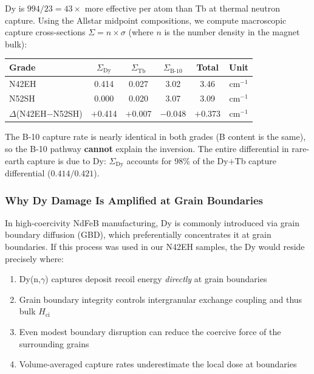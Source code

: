 \documentclass[11pt,letterpaper]{article}
\newcommand{\Hci}{H_\mathrm{ci}}
\begin{document}
Dy is $994/23 = 43\times$ more effective per atom than Tb at thermal neutron
capture. Using the Allstar midpoint compositions, we compute macroscopic
capture cross-sections $\Sigma = n \times \sigma$ (where $n$ is the number
density in the magnet bulk):

\begin{center}
\begin{tabular}{lccccc}
\toprule
Grade  & $\Sigma_\mathrm{Dy}$ & $\Sigma_\mathrm{Tb}$ & $\Sigma_\mathrm{B\text{-}10}$ & Total & Unit \\
\midrule
N42EH  & 0.414  & 0.027  & 3.02  & 3.46  & cm$^{-1}$ \\
N52SH  & 0.000  & 0.020  & 3.07  & 3.09  & cm$^{-1}$ \\
\midrule
$\Delta$(N42EH$-$N52SH) & $+$0.414 & $+$0.007 & $-$0.048 & $+$0.373 & cm$^{-1}$ \\
\bottomrule
\end{tabular}
\end{center}

The B-10 capture rate is nearly identical in both grades (B content is the
same), so the B-10 pathway \textbf{cannot} explain the inversion. The entire
differential in rare-earth capture is due to Dy: $\Sigma_\mathrm{Dy}$
accounts for 98\% of the Dy$+$Tb capture differential ($0.414/0.421$).

\subsubsection{Why Dy Damage Is Amplified at Grain Boundaries}

In high-coercivity NdFeB manufacturing, Dy is commonly introduced via grain
boundary diffusion (GBD), which preferentially concentrates it at grain
boundaries. If this process was used in our N42EH samples, the Dy would
reside precisely where:
\begin{enumerate}
    \item Dy(n,$\gamma$) captures deposit recoil energy \emph{directly} at
    grain boundaries
    \item Grain boundary integrity controls intergranular exchange coupling
    and thus bulk $\Hci$
    \item Even modest boundary disruption can reduce the coercive force of
    the surrounding grains
    \item Volume-averaged capture rates underestimate the local dose at
    boundaries
\end{enumerate}
\end{document}
